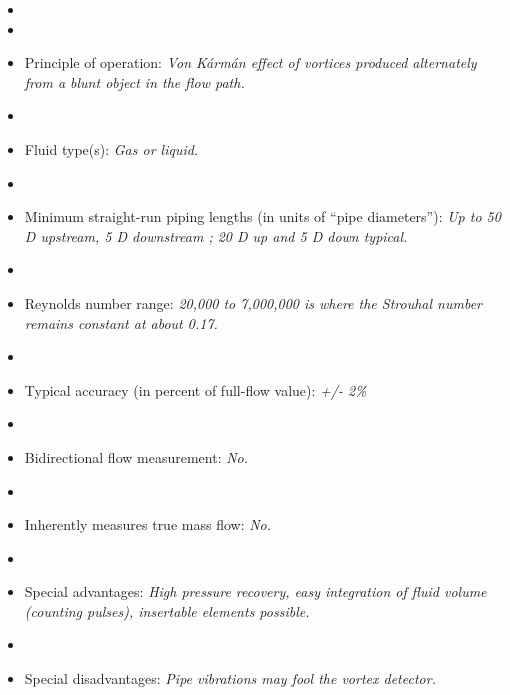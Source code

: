 \begin{itemize}
\goodbreak
\item{} 
\vskip 5pt
\item\item{} Principle of operation: {\it Von K\'arm\'an effect of vortices produced alternately from a blunt object in the flow path.}
\vskip 5pt
\item\item{} Fluid type(s): {\it Gas or liquid.}
\vskip 5pt
\item\item{} Minimum straight-run piping lengths (in units of ``pipe diameters''): {\it Up to 50 D upstream, 5 D downstream ; 20 D up and 5 D down typical.}
\vskip 5pt
\item\item{} Reynolds number range: {\it 20,000 to 7,000,000 is where the Strouhal number remains constant at about 0.17.}
\vskip 5pt
\item\item{} Typical accuracy (in percent of full-flow value): {\it +/- 2\%}
\vskip 5pt
\item\item{} Bidirectional flow measurement: {\it No.}
\vskip 5pt
\item\item{} Inherently measures true mass flow: {\it No.}
\vskip 5pt
\item\item{} Special advantages: {\it High pressure recovery, easy integration of fluid volume (counting pulses), insertable elements possible.}
\vskip 5pt
\item\item{} Special disadvantages: {\it Pipe vibrations may fool the vortex detector.}
\end{itemize}

